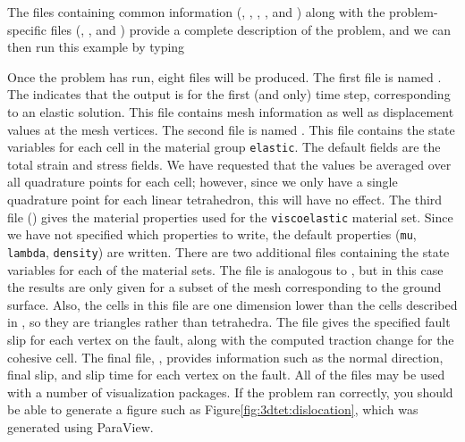The files containing common information
(,
, ,
, and
) along with the
problem-specific files (,
, and )
provide a complete description of the problem, and we can then run
this example by typing
Once the problem has run, eight files will be produced. The first file
is named . The 
indicates that the output is for the first (and only) time step,
corresponding to an elastic solution. This file contains mesh
information as well as displacement values at the mesh vertices. The
second file is named
. This file contains
the state variables for each cell in the material group
\texttt{elastic}.  The default fields are the total strain and stress
fields. We have requested that the values be averaged over all
quadrature points for each cell; however, since we only have a single
quadrature point for each linear tetrahedron, this will have no
effect. The third file
() gives the
material properties used for the \texttt{viscoelastic} material
set. Since we have not specified which properties to write, the
default properties (\texttt{mu}, \texttt{lambda}, \texttt{density})
are written. There are two additional files containing the state
variables for each of the material sets. The file
 is analogous to
, but in this case the results are only
given for a subset of the mesh corresponding to the ground
surface. Also, the cells in this file are one dimension lower than the
cells described in , so they are
triangles rather than tetrahedra. The file
 gives the specified fault slip
for each vertex on the fault, along with the computed traction change
for the cohesive cell. The final file,
, provides information such as the
normal direction, final slip, and slip time for each vertex on the
fault. All of the  files may be used with a number of
visualization packages. If the problem ran correctly, you should be
able to generate a figure such as Figure\vref{fig:3dtet:dislocation},
which was generated using ParaView.


